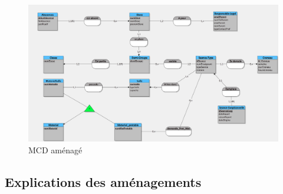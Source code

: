 \documentclass[12pt,french,titlepage]{article}
\begin{document}
    \begin{figure}[H]
	      \centering
	      \includegraphics[scale=0.1]{./mcd_amenage.jpg}
	      \caption{MCD aménagé}
	      
	   
	      
	  \end{figure}
	  
	  \subsection{Explications des aménagements}
	  
\end{document}
